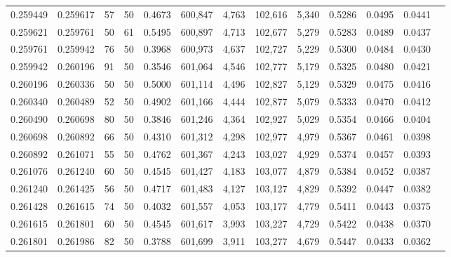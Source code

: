 \begin{tabular}{rrrrrrrrrrrrr}
0.259449 & 0.259617 &    57 &  50 &                                     0.4673 & 600,847 &   4,763 & 102,616 &   5,340 & 0.5286 & 0.0495 & 0.0441 \\
0.259621 & 0.259761 &    50 &  61 &                                     0.5495 & 600,897 &   4,713 & 102,677 &   5,279 & 0.5283 & 0.0489 & 0.0437 \\
0.259761 & 0.259942 &    76 &  50 &                                     0.3968 & 600,973 &   4,637 & 102,727 &   5,229 & 0.5300 & 0.0484 & 0.0430 \\
0.259942 & 0.260196 &    91 &  50 &                                     0.3546 & 601,064 &   4,546 & 102,777 &   5,179 & 0.5325 & 0.0480 & 0.0421 \\
0.260196 & 0.260336 &    50 &  50 &                                     0.5000 & 601,114 &   4,496 & 102,827 &   5,129 & 0.5329 & 0.0475 & 0.0416 \\
0.260340 & 0.260489 &    52 &  50 &                                     0.4902 & 601,166 &   4,444 & 102,877 &   5,079 & 0.5333 & 0.0470 & 0.0412 \\
0.260490 & 0.260698 &    80 &  50 &                                     0.3846 & 601,246 &   4,364 & 102,927 &   5,029 & 0.5354 & 0.0466 & 0.0404 \\
0.260698 & 0.260892 &    66 &  50 &                                     0.4310 & 601,312 &   4,298 & 102,977 &   4,979 & 0.5367 & 0.0461 & 0.0398 \\
0.260892 & 0.261071 &    55 &  50 &                                     0.4762 & 601,367 &   4,243 & 103,027 &   4,929 & 0.5374 & 0.0457 & 0.0393 \\
0.261076 & 0.261240 &    60 &  50 &                                     0.4545 & 601,427 &   4,183 & 103,077 &   4,879 & 0.5384 & 0.0452 & 0.0387 \\
0.261240 & 0.261425 &    56 &  50 &                                     0.4717 & 601,483 &   4,127 & 103,127 &   4,829 & 0.5392 & 0.0447 & 0.0382 \\
0.261428 & 0.261615 &    74 &  50 &                                     0.4032 & 601,557 &   4,053 & 103,177 &   4,779 & 0.5411 & 0.0443 & 0.0375 \\
0.261615 & 0.261801 &    60 &  50 &                                     0.4545 & 601,617 &   3,993 & 103,227 &   4,729 & 0.5422 & 0.0438 & 0.0370 \\
0.261801 & 0.261986 &    82 &  50 &                                     0.3788 & 601,699 &   3,911 & 103,277 &   4,679 & 0.5447 & 0.0433 & 0.0362 \\

\end{tabular}
